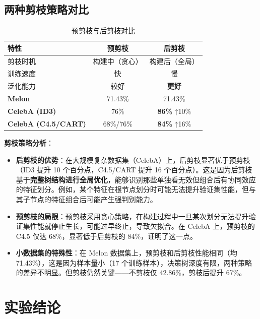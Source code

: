 \documentclass[UTF8]{ctexart}
\begin{document}
\subsection{两种剪枝策略对比}

\begin{table}[H]
    \centering
    \caption{预剪枝与后剪枝对比}
    \begin{tabular}{lcc}
    \toprule
    \textbf{特性} & \textbf{预剪枝} & \textbf{后剪枝} \\
    \midrule
    剪枝时机 & 构建中（贪心） & 构建后（全局） \\
    训练速度 & 快 & 慢 \\
    泛化能力 & 较好 & \textbf{更好} \\
    \midrule
    \textbf{Melon} & 71.43\% & 71.43\% \\
    \textbf{CelebA (ID3)} & 76\% & \textbf{86\%} ↑10\% \\
    \textbf{CelebA (C4.5/CART)} & 68\%/76\% & \textbf{84\%} ↑16\% \\
    \bottomrule
    \end{tabular}
\end{table}

\noindent \textbf{剪枝策略分析}：

\begin{itemize}
    \item \textbf{后剪枝的优势}：在大规模复杂数据集（CelebA）上，后剪枝显著优于预剪枝（ID3 提升 10 个百分点，C4.5/CART 提升 16 个百分点）。这是因为后剪枝基于\textbf{完整树结构进行全局优化}，能够识别那些单独看无效但组合后有协同效应的特征划分。例如，某个特征在根节点划分时可能无法提升验证集性能，但与其子节点的特征组合后可能产生强判别能力。
    
    \item \textbf{预剪枝的局限}：预剪枝采用贪心策略，在构建过程中一旦某次划分无法提升验证集性能就停止生长，可能过早终止，导致欠拟合。在 CelebA 上，预剪枝的 C4.5 仅达 68\%，显著低于后剪枝的 84\%，证明了这一点。
    
    \item \textbf{小数据集的特殊性}：在 Melon 数据集上，预剪枝和后剪枝性能相同（均 71.43\%），这是因为样本量小（17 个训练样本），决策树深度有限，两种策略的差异不明显。但剪枝仍然关键——不剪枝仅 42.86\%，剪枝后提升 67\%。

\end{itemize}

\section{实验结论}
\end{document}

